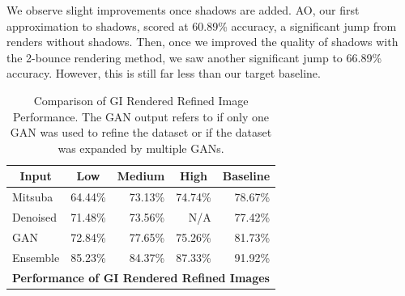 \documentclass[10pt,twocolumn,letterpaper]{article}
\newcommand{\tompson}[1]{{\color{green} JT: #1}}
\begin{document}
We observe slight improvements once shadows are added. AO, our first approximation to shadows, scored at 60.89\% accuracy, a significant jump from renders without shadows. Then, once we improved the quality of shadows with the 2-bounce rendering method, we saw another significant jump to 66.89\% accuracy. However, this is still far less than our target baseline.

\begin{table}[]
\centering
\begin{tabular}{|l|r|r|r|r|}
\hline
\multicolumn{1}{|c|}{\textbf{Input}}
& \multicolumn{1}{c|}{\textbf{Low}}
& \multicolumn{1}{c|}{\textbf{Medium}}
& \multicolumn{1}{c|}{\textbf{High}}
& \multicolumn{1}{c|}{\textbf{Baseline}} \\ \hline
Mitsuba& 64.44\%	& 73.13\%	& 74.74\%	& 78.67\% \\
Denoised& 71.48\%	& 73.56\%	& N/A 		& 77.42\%	\\
GAN& 72.84\%	& 77.65\% 	& 75.26\%	& 81.73\%	\\
Ensemble& 85.23\%	& 84.37\% 	& 87.33\% 	& 91.92\%		\\ \hline
\multicolumn{5}{|c|}{\textbf{Performance of GI Rendered Refined Images}}	\\ \hline
\end{tabular}
\caption{Comparison of GI Rendered Refined Image Performance. The GAN output refers to if only one GAN was used to refine the dataset or if the dataset was expanded by multiple GANs.}
\label{table:tblallrefined}
\end{table}
\end{document}
